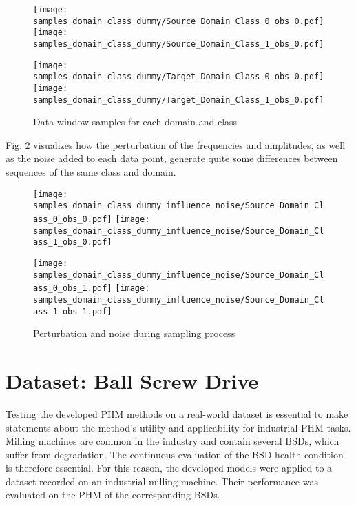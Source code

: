 \begin{figure}[H]
  \centering
  \texttt{[image: samples\_domain\_class\_dummy/Source\_Domain\_Class\_0\_obs\_0.pdf]}
  \hspace{.3cm}
  \texttt{[image: samples\_domain\_class\_dummy/Source\_Domain\_Class\_1\_obs\_0.pdf]}

  \vspace{.3cm}

  \texttt{[image: samples\_domain\_class\_dummy/Target\_Domain\_Class\_0\_obs\_0.pdf]}
  \hspace{.3cm}
  \texttt{[image: samples\_domain\_class\_dummy/Target\_Domain\_Class\_1\_obs\_0.pdf]}

  \caption{Data window samples for each domain and class}
  \label{fig:samples_domain_class_dummy}
\end{figure}

Fig. \ref{fig:samples_domain_class_dummy_influence_noise} visualizes how the perturbation of the frequencies and amplitudes, as well as the noise added to each data point, generate quite some differences between sequences of the same class and domain.

\begin{figure}[H]
  \centering
  \texttt{[image: samples\_domain\_class\_dummy\_influence\_noise/Source\_Domain\_Class\_0\_obs\_0.pdf]}
  \hspace{.3cm}
  \texttt{[image: samples\_domain\_class\_dummy\_influence\_noise/Source\_Domain\_Class\_1\_obs\_0.pdf]}

  \vspace{.3cm}

  \texttt{[image: samples\_domain\_class\_dummy\_influence\_noise/Source\_Domain\_Class\_0\_obs\_1.pdf]}
  \hspace{.3cm}
  \texttt{[image: samples\_domain\_class\_dummy\_influence\_noise/Source\_Domain\_Class\_1\_obs\_1.pdf]}

  \caption{Perturbation and noise during sampling process}
  \label{fig:samples_domain_class_dummy_influence_noise}
\end{figure}

\section{Dataset: Ball Screw Drive}
Testing the developed PHM methods on a real-world dataset is essential to make statements about the method's utility and applicability for industrial PHM tasks. Milling machines are common in the industry and contain several BSDs, which suffer from degradation. The continuous evaluation of the BSD health condition is therefore essential. For this reason, the developed models were applied to a dataset recorded on an industrial milling machine. Their performance was evaluated on the PHM of the corresponding BSDs.

